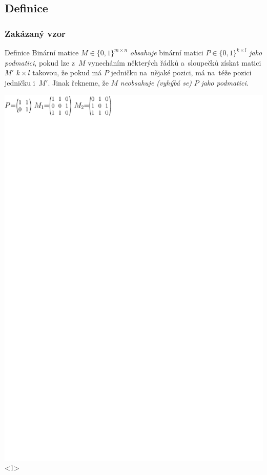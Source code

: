 \documentclass{beamer}
\begin{document}
\subsection{Definice}
\begin{frame}
\frametitle{Zakázaný vzor}
\begin{block}{Definice}
Binární matice $M\in\{0,1\}^{m\times n}$ \emph{obsahuje} binární matici $P\in\{0,1\}^{k\times l}$ \emph{jako podmatici}, pokud lze z~$M$ vynecháním některých řádků a~sloupečků získat matici $M'$ $k\times l$ takovou, že pokud má $P$ jedničku na~nějaké pozici, má na~téže pozici jedničku i~$M'$. Jinak řekneme, že $M$ \emph{neobsahuje (vyhýbá se)} $P$ \emph{jako podmatici}.
\end{block}
\vspace{5mm}
\centering
\includegraphics{../img/example.pdf}<1>

\end{frame}
\end{document}
